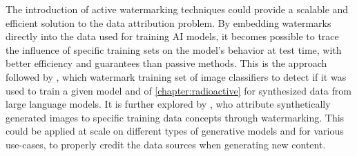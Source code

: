 The introduction of active watermarking techniques could provide a scalable and efficient solution to the data attribution problem.
By embedding watermarks directly into the data used for training AI models, it becomes possible to trace the influence of specific training sets on the model's behavior at test time, with better efficiency and guarantees than passive methods.
This is the approach followed by \citet{sablayrolles2020radioactive}, which watermark training set of image classifiers to detect if it was used to train a given model and of \autoref{chapter:radioactive} for synthesized data from large language models.
It is further explored by \citet{asnani2024promark}, who attribute synthetically generated images to specific training data concepts through watermarking.
This could be applied at scale on different types of generative models and for various use-cases, to properly credit the data sources when generating new content.


